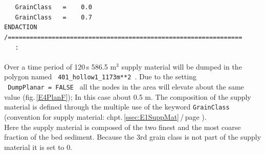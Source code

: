 \hspace*{3mm} \texttt{\small{~~~GrainClass~~~=~~~~0.0}}                                         \\
\hspace*{3mm} \texttt{\small{~~~GrainClass~~~=~~~~0.7}}                                         \\
\hspace*{3mm} \texttt{\small{ENDACTION}}                                                        \\
\hspace*{3mm} \texttt{\small{/================================================================}}\\
\hspace*{3mm} \texttt{\small{~~~:}}\\
\\
Over a time period of 120\,s 586.5 m$^3$ supply material will be dumped in the polygon named
\texttt{~401\_hollow1\_1173m**2~}. Due to the setting \texttt{~DumpPlanar~=~FALSE~} all the nodes
in the area will elevate about the same value (fig.\,\ref{E4PlanF}); In this case about 0.5 m.
The composition of the supply material is defined through the multiple use of the keyword \texttt{GrainClass}
(convention for supply material: chpt.\,\ref{ssec:E1SuppMat}\,/\,page \pageref{txt:SupplyMaterial}).\\
Here the supply material is composed of the two finest and the most coarse fraction of the bed sediment.
Because the 3rd grain class is not part of the supply material it is set to 0.\\


\newpage

